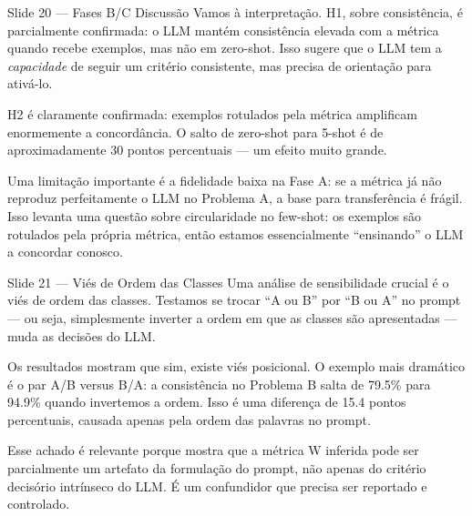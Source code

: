 \documentclass[aspectratio=169,11pt]{beamer}
\begin{document}
\begin{frame}{Slide 20 --- Fases B/C Discussão}
\small
Vamos à interpretação. H1, sobre consistência, é parcialmente confirmada: o LLM mantém consistência elevada com a métrica quando recebe exemplos, mas não em zero-shot. Isso sugere que o LLM tem a \textit{capacidade} de seguir um critério consistente, mas precisa de orientação para ativá-lo.

H2 é claramente confirmada: exemplos rotulados pela métrica amplificam enormemente a concordância. O salto de zero-shot para 5-shot é de aproximadamente 30 pontos percentuais --- um efeito muito grande.

Uma limitação importante é a fidelidade baixa na Fase A: se a métrica já não reproduz perfeitamente o LLM no Problema A, a base para transferência é frágil. Isso levanta uma questão sobre circularidade no few-shot: os exemplos são rotulados pela própria métrica, então estamos essencialmente ``ensinando'' o LLM a concordar conosco.
\end{frame}

\begin{frame}{Slide 21 --- Viés de Ordem das Classes}
\small
Uma análise de sensibilidade crucial é o viés de ordem das classes. Testamos se trocar ``A ou B'' por ``B ou A'' no prompt --- ou seja, simplesmente inverter a ordem em que as classes são apresentadas --- muda as decisões do LLM.

Os resultados mostram que sim, existe viés posicional. O exemplo mais dramático é o par A/B versus B/A: a consistência no Problema B salta de 79.5\% para 94.9\% quando invertemos a ordem. Isso é uma diferença de 15.4 pontos percentuais, causada apenas pela ordem das palavras no prompt.

Esse achado é relevante porque mostra que a métrica W inferida pode ser parcialmente um artefato da formulação do prompt, não apenas do critério decisório intrínseco do LLM. É um confundidor que precisa ser reportado e controlado.
\end{frame}
\end{document}
